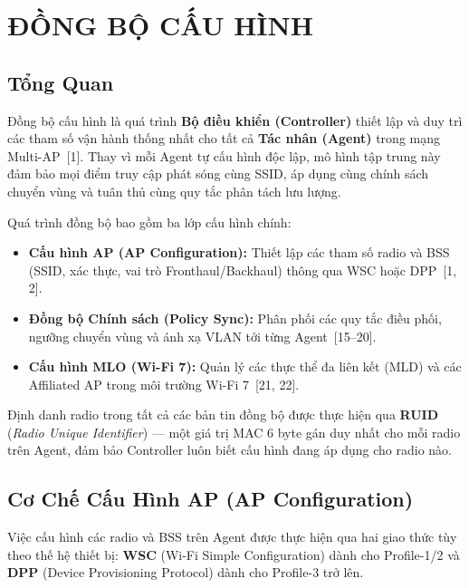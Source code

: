 \chapter{ĐỒNG BỘ CẤU HÌNH}
\label{chapter:chapter-4}

\section{Tổng Quan}

Đồng bộ cấu hình là quá trình \textbf{Bộ điều khiển (Controller)} thiết lập và duy trì
các tham số vận hành thống nhất cho tất cả \textbf{Tác nhân (Agent)} trong mạng
Multi-AP~[1]. Thay vì mỗi Agent tự cấu hình độc lập, mô hình tập trung này đảm bảo mọi
điểm truy cập phát sóng cùng SSID, áp dụng cùng chính sách chuyển vùng và tuân thủ
cùng quy tắc phân tách lưu lượng.

Quá trình đồng bộ bao gồm ba lớp cấu hình chính:
\begin{itemize}
	\item \textbf{Cấu hình AP (AP Configuration):} Thiết lập các tham số radio và BSS
	(SSID, xác thực, vai trò Fronthaul/Backhaul) thông qua WSC hoặc DPP~[1, 2].
	\item \textbf{Đồng bộ Chính sách (Policy Sync):} Phân phối các quy tắc điều phối,
	ngưỡng chuyển vùng và ánh xạ VLAN tới từng Agent~[15--20].
	\item \textbf{Cấu hình MLO (Wi-Fi 7):} Quản lý các thực thể đa liên kết (MLD) và
	các Affiliated AP trong môi trường Wi-Fi 7~[21, 22].
\end{itemize}

Định danh radio trong tất cả các bản tin đồng bộ được thực hiện qua \textbf{RUID}
(\textit{Radio Unique Identifier}) --- một giá trị MAC 6 byte gán duy nhất cho mỗi radio
trên Agent, đảm bảo Controller luôn biết cấu hình đang áp dụng cho radio nào.


\section{Cơ Chế Cấu Hình AP (AP Configuration)}

Việc cấu hình các radio và BSS trên Agent được thực hiện qua hai giao thức tùy theo
thế hệ thiết bị: \textbf{WSC} (Wi-Fi Simple Configuration) dành cho Profile-1/2 và
\textbf{DPP} (Device Provisioning Protocol) dành cho Profile-3 trở lên.


